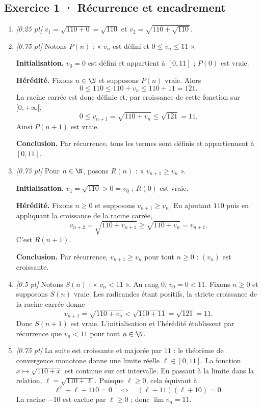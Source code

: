 \subsection*{Exercice 1 · Récurrence et encadrement}\begin{enumerate}

\item \textit{[\num{0,25} pt]} $v_1=\sqrt{110+0}=\sqrt{110}$ et $v_2=\sqrt{110+\sqrt{110}}$.

\item \textit{[\num{0,75} pt]} Notons $P(n)$ : « $v_n$ est défini et $0\le v_n\le 11$ ».
\par\smallskip\textbf{Initialisation.} $v_0=0$ est défini et appartient à $[0,11]$ ; $P(0)$ est vraie.
\par\smallskip\textbf{Hérédité.} Fixons $n\in\N$ et supposons $P(n)$ vraie. Alors
\[0\le 110\le 110+v_n\le 110+11=121.\]
La racine carrée est donc définie et, par croissance de cette fonction sur $[0,+\infty[$,
\[0\le v_{n+1}=\sqrt{110+v_n}\le\sqrt{121}=11.\]
Ainsi $P(n+1)$ est vraie.
\par\smallskip\textbf{Conclusion.} Par récurrence, tous les termes sont définis et appartiennent à $[0,11]$.

\item \textit{[\num{0,75} pt]} Pour $n\in\N$, posons $R(n)$ : « $v_{n+1}\ge v_n$ ».
\par\smallskip\textbf{Initialisation.} $v_1=\sqrt{110}>0=v_0$ ; $R(0)$ est vraie.
\par\smallskip\textbf{Hérédité.} Fixons $n\ge0$ et supposons $v_{n+1}\ge v_n$. En ajoutant $110$ puis en appliquant la croissance de la racine carrée,
\[v_{n+2}=\sqrt{110+v_{n+1}}\ge\sqrt{110+v_n}=v_{n+1}.\]
C'est $R(n+1)$.
\par\smallskip\textbf{Conclusion.} Par récurrence, $v_{n+1}\ge v_n$ pour tout $n\ge0$ : $(v_n)$ est croissante.

\item \textit{[\num{0,5} pt]} Notons $S(n)$ : « $v_n<11$ ». Au rang $0$, $v_0=0<11$.
Fixons $n\ge0$ et supposons $S(n)$ vraie. Les radicandes étant positifs, la stricte croissance de la racine carrée donne
\[v_{n+1}=\sqrt{110+v_n}<\sqrt{110+11}=\sqrt{121}=11.\]
Donc $S(n+1)$ est vraie. L'initialisation et l'hérédité établissent par récurrence que $v_n<11$ pour tout $n\in\N$.

\item \textit{[\num{0,75} pt]} La suite est croissante et majorée par $11$ : le théorème de convergence monotone donne une limite réelle $\ell\in[0,11]$.
La fonction $x\mapsto\sqrt{110+x}$ est continue sur cet intervalle. En passant à la limite dans la relation, $\ell=\sqrt{110+\ell}$. Puisque $\ell\ge0$, cela équivaut à
\[\ell^2-\ell-110=0\quad\Longleftrightarrow\quad(\ell-11)(\ell+10)=0.\]
La racine $-10$ est exclue par $\ell\ge0$ ; donc $\lim v_n=11$.


\end{enumerate}
